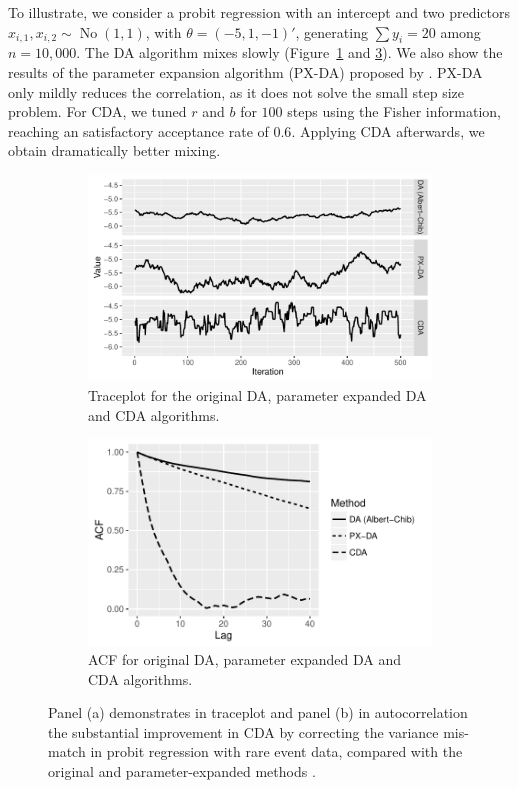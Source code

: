 \documentclass[10pt]{article}
\DeclareMathOperator{\No}{No}
\begin{document}
To illustrate, we consider a probit regression with an intercept and two predictors $x_{i,1},x_{i,2}\sim \No(1,1)$, with $\theta=(-5,1,-1)'$, generating $\sum y_i=20$ among $n=10,000$. The \cite{albert1993bayesian} DA algorithm mixes slowly (Figure~\ref{probit_reg_trace} and \ref{probit_reg_acf}). We also show the 
results of the parameter expansion algorithm (PX-DA) proposed by \cite{liu1999parameter}. PX-DA only mildly reduces the correlation, as it does not solve the small step size problem.  For CDA, we tuned $r$ and $b$ for $100$ steps using the Fisher information, reaching an satisfactory acceptance rate of $0.6$. Applying CDA afterwards, we obtain dramatically better mixing. 

 
\begin{figure}[H]
  \begin{subfigure}[b]{0.45\textwidth}
 \includegraphics[width=1\textwidth]{probit15_trace_plot.pdf}
  \caption{Traceplot for the original DA, parameter expanded DA and CDA algorithms.}
  \label{probit_reg_trace}
\end{subfigure}
  \hfill
   \begin{subfigure}[b]{0.45\textwidth}
 \includegraphics[width=1\textwidth]{probit15_acf.pdf}
  \caption{ACF for original DA, parameter expanded DA and CDA algorithms.}
    \label{probit_reg_acf}
\end{subfigure}
 \caption{Panel (a) demonstrates in traceplot and panel (b) in autocorrelation the substantial improvement in CDA by correcting the variance mis-match in probit regression with rare event data, compared with the original \citep{albert1993bayesian} and parameter-expanded methods \citep{liu1999parameter}.}
 \end{figure}
 
\end{document}
